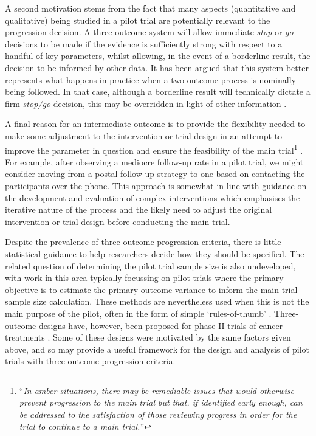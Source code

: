 \documentclass[sagev]{sagej}
\begin{document}
A second motivation stems from the fact that many aspects (quantitative and qualitative) being studied in a pilot trial are potentially relevant to the progression decision. A three-outcome system will allow immediate \emph{stop} or \emph{go} decisions to be made if the evidence is sufficiently strong with respect to a handful of key parameters, whilst allowing, in the event of a borderline result, the decision to be informed by other data. It has been argued that this system better represents what happens in practice when a two-outcome process is nominally being followed. In that case, although a borderline result will technically dictate a firm \emph{stop/go} decision, this may be overridden in light of other information \cite{Sargent2001}.

A final reason for an intermediate outcome is to provide the flexibility needed to make some adjustment to the intervention or trial design in an attempt to improve the parameter in question and ensure the feasibility of the main trial\footnote{``\emph{In amber situations, there may be remediable issues that would otherwise prevent progression to the main trial but that, if identified early enough, can be addressed to the satisfaction of those reviewing progress in order for the trial to continue to a main trial.}''} \cite{Avery2017}. For example, after observing a mediocre follow-up rate in a pilot trial, we might consider moving from a postal follow-up strategy to one based on contacting the participants over the phone. This approach is somewhat in line with guidance on the development and evaluation of complex interventions \cite{Craig2008} which emphasises the iterative nature of the process and the likely need to adjust the original intervention or trial design before conducting the main trial.

Despite the prevalence of three-outcome progression criteria\cite{Herbert2019}, there is little statistical guidance to help researchers decide how they should be specified. The related question of determining the pilot trial sample size is also undeveloped, with work in this area typically focussing on pilot trials where the primary objective is to estimate the primary outcome variance to inform the main trial sample size calculation. These methods are nevertheless used when this is not the main purpose of the pilot, often in the form of simple `rules-of-thumb' \cite{Browne1995, Teare2014, Whitehead2015}. Three-outcome designs have, however, been proposed for phase II trials of cancer treatments \cite{Kirby2016}. Some of these designs were motivated by the same factors given above, and so may provide a useful framework for the design and analysis of pilot trials with three-outcome progression criteria.
\end{document}
